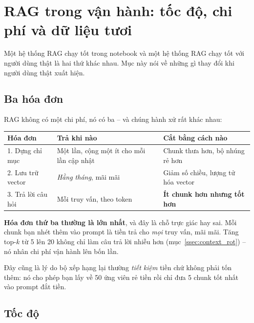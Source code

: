 
\section{RAG trong vận hành: tốc độ, chi phí và dữ liệu tươi}
\label{sec:rag_operations}

Một hệ thống RAG chạy tốt trong notebook và một hệ thống RAG chạy tốt với người dùng thật là hai thứ khác nhau. Mục này nói về những gì thay đổi khi người dùng thật xuất hiện.

\subsection{Ba hóa đơn}
\label{ssec:rag_cost}

RAG không có một chi phí, nó có ba -- và chúng hành xử rất khác nhau:

\begin{center}
\small
\begin{tabular}{@{}lll@{}}
\toprule
\textbf{Hóa đơn} & \textbf{Trả khi nào} & \textbf{Cắt bằng cách nào} \\
\midrule
1. Dựng chỉ mục & Một lần, cộng một ít cho mỗi lần cập nhật & Chunk thưa hơn, bộ nhúng rẻ hơn \\
2. Lưu trữ vector & \emph{Hằng tháng}, mãi mãi & Giảm số chiều, lượng tử hóa vector \\
3. Trả lời câu hỏi & Mỗi truy vấn, theo token & \textbf{Ít chunk hơn nhưng tốt hơn} \\
\bottomrule
\end{tabular}
\end{center}

\noindent \textbf{Hóa đơn thứ ba thường là lớn nhất}, và đây là chỗ trực giác hay sai. Mỗi chunk bạn nhét thêm vào prompt là tiền trả cho \emph{mọi} truy vấn, mãi mãi. Tăng top-$k$ từ 5 lên 20 không chỉ làm câu trả lời nhiễu hơn (mục~\ref{ssec:context_rot}) -- nó nhân chi phí vận hành lên bốn lần.

Đây cũng là lý do bộ xếp hạng lại thường \emph{tiết kiệm} tiền chứ không phải tốn thêm: nó cho phép bạn lấy về 50 ứng viên rẻ tiền rồi chỉ đưa 5 chunk tốt nhất vào prompt đắt tiền.

\subsection{Tốc độ}
\label{ssec:rag_latency}

